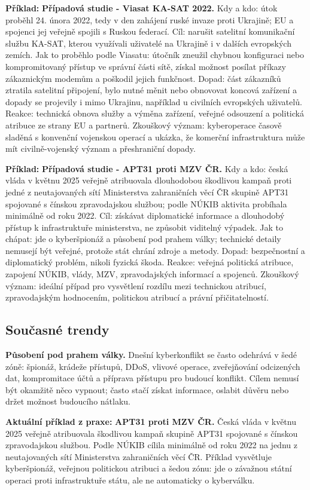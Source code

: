 \documentclass[11pt,a4paper]{article}
\newcommand{\priklad}[1]{\begin{tcolorbox}[breakable,enhanced,colback=green!7,colframe=green!30!black,boxrule=0pt,arc=1mm,left=5pt,right=5pt,top=5pt,bottom=5pt,before skip=6pt,after skip=6pt]\textbf{Příklad:} #1\end{tcolorbox}}
\newcommand{\aktualni}[1]{\begin{tcolorbox}[breakable,enhanced,colback=green!10,colframe=green!35!black,boxrule=0pt,arc=1mm,left=5pt,right=5pt,top=5pt,bottom=5pt,before skip=6pt,after skip=6pt]\textbf{Aktuální příklad z praxe:} #1\end{tcolorbox}}
\begin{document}
\priklad{\textbf{Případová studie - Viasat KA-SAT 2022.} Kdy a kdo: útok proběhl 24. února 2022, tedy v den zahájení ruské invaze proti Ukrajině; EU a spojenci jej veřejně spojili s Ruskou federací. Cíl: narušit satelitní komunikační službu KA-SAT, kterou využívali uživatelé na Ukrajině i v dalších evropských zemích. Jak to proběhlo podle Viasatu: útočník zneužil chybnou konfiguraci nebo kompromitovaný přístup ve správní části sítě, získal možnost posílat příkazy zákaznickým modemům a poškodil jejich funkčnost. Dopad: část zákazníků ztratila satelitní připojení, bylo nutné měnit nebo obnovovat koncová zařízení a dopady se projevily i mimo Ukrajinu, například u civilních evropských uživatelů. Reakce: technická obnova služby a výměna zařízení, veřejné odsouzení a politická atribuce ze strany EU a partnerů. Zkouškový význam: kyberoperace časově sladěná s konvenční vojenskou operací a ukázka, že komerční infrastruktura může mít civilně-vojenský význam a přeshraniční dopady.}

\priklad{\textbf{Případová studie - APT31 proti MZV ČR.} Kdy a kdo: česká vláda v květnu 2025 veřejně atribuovala dlouhodobou škodlivou kampaň proti jedné z neutajovaných sítí Ministerstva zahraničních věcí ČR skupině APT31 spojované s čínskou zpravodajskou službou; podle NÚKIB aktivita probíhala minimálně od roku 2022. Cíl: získávat diplomatické informace a dlouhodobý přístup k infrastruktuře ministerstva, ne způsobit viditelný výpadek. Jak to chápat: jde o kyberšpionáž a působení pod prahem války; technické detaily nemusejí být veřejné, protože stát chrání zdroje a metody. Dopad: bezpečnostní a diplomatický problém, nikoli fyzická škoda. Reakce: veřejná politická atribuce, zapojení NÚKIB, vlády, MZV, zpravodajských informací a spojenců. Zkouškový význam: ideální případ pro vysvětlení rozdílu mezi technickou atribucí, zpravodajským hodnocením, politickou atribucí a právní přičitatelností.}

\subsection*{Současné trendy}
\textbf{Působení pod prahem války.} Dnešní kyberkonflikt se často odehrává v šedé zóně: špionáž, krádeže přístupů, DDoS, vlivové operace, zveřejňování odcizených dat, kompromitace účtů a příprava přístupu pro budoucí konflikt. Cílem nemusí být okamžitě něco vypnout; často stačí získat informace, oslabit důvěru nebo držet možnost budoucího nátlaku.

\aktualni{\textbf{APT31 proti MZV ČR.} Česká vláda v květnu 2025 veřejně atribuovala škodlivou kampaň skupině APT31 spojované s čínskou zpravodajskou službou. Podle NÚKIB cílila minimálně od roku 2022 na jednu z neutajovaných sítí Ministerstva zahraničních věcí ČR. Příklad vysvětluje kyberšpionáž, veřejnou politickou atribuci a šedou zónu: jde o závažnou státní operaci proti infrastruktuře státu, ale ne automaticky o kyberválku.}
\end{document}
